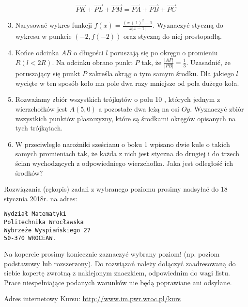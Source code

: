 \documentclass[10pt]{article}
\begin{document}
$$
\overrightarrow{P K}+\overrightarrow{P L}+\overrightarrow{P M}=\overrightarrow{P A}+\overrightarrow{P B}+\overrightarrow{P C}
$$

\begin{enumerate}
  \setcounter{enumi}{2}
  \item Narysować wykres funkcji $f(x)=\frac{(x+1)^{2}-1}{x|x-1|}$. Wyznaczyć styczną do wykresu w punkcie $(-2, f(-2))$ oraz styczną do niej prostopadłą.
  \item Końce odcinka $A B$ o długości $l$ poruszają się po okręgu o promieniu $R(l<2 R)$. Na odcinku obrano punkt $P$ tak, że $\frac{|A P|}{|P B|}=\frac{1}{3}$. Uzasadnić, że poruszający się punkt $P$ zakreśla okrąg o tym samym środku. Dla jakiego $l$ wycięte w ten sposób koło ma pole dwa razy mniejsze od pola dużego koła.
  \item Rozważamy zbiór wszystkich trójkątów o polu 10 , których jednym z wierzchołków jest $A(5,0)$ a pozostałe dwa leżą na osi $O y$. Wyznaczyć zbiór wszystkich punktów płaszczyzny, które są środkami okręgów opisanych na tych trójkątach.
  \item W przeciwległe narożniki sześcianu o boku 1 wpisano dwie kule o takich samych promieniach tak, że każda z nich jest styczna do drugiej i do trzech ścian wychodzących z odpowiedniego wierzchołka. Jaka jest odległość ich środków?
\end{enumerate}

Rozwiązania (rękopis) zadań z wybranego poziomu prosimy nadsyłać do 18 stycznia 2018r. na adres:

\begin{verbatim}
Wydział Matematyki
Politechnika Wrocławska
Wybrzeże Wyspiańskiego 27
50-370 WROCEAW.
\end{verbatim}

Na kopercie prosimy koniecznie zaznaczyć wybrany poziom! (np. poziom podstawowy lub rozszerzony). Do rozwiązań należy dołączyć zaadresowaną do siebie kopertę zwrotną z naklejonym znaczkiem, odpowiednim do wagi listu. Prace niespełniające podanych warunków nie będą poprawiane ani odsyłane.

Adres internetowy Kursu: \href{http://www.im.pwr.wroc.pl/kurs}{http://www.im.pwr.wroc.pl/kurs}
\end{document}

